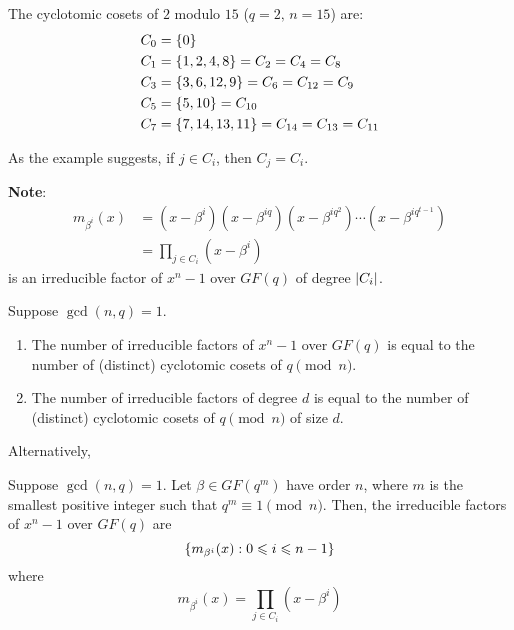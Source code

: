 \begin{Example}{}{}
    The cyclotomic cosets of $ 2 $ modulo $ 15 $ ($ q=2,\,n=15 $) are:
    \begin{align*}
        C_0 & =\{0\}                               \\
        C_1 & =\{1,2,4,8\}=C_2=C_4=C_8             \\
        C_3 & =\{3,6,12,9\}=C_6=C_{12}=C_9         \\
        C_5 & =\{5,10\}=C_{10}                     \\
        C_7 & =\{7,14,13,11\}=C_{14}=C_{13}=C_{11}
    \end{align*}
\end{Example}

As the example suggests, if $ j\in C_i $, then $ C_j=C_i $.

\textbf{Note}:
\begin{align*}
    m_{\beta^i}(x)
     & =(x-\beta^i)(x-\beta^{iq})(x-\beta^{iq^2})\cdots(x-\beta^{iq^{t-1}}) \\
     & =\prod_{j\in C_i}(x-\beta^i)
\end{align*}
is an irreducible factor of $ x^n-1 $ over $ GF(q) $ of degree $ \lvert C_i\rvert $.


\begin{Theorem}{}{}
    Suppose $ \gcd(n,q)=1 $.
    \begin{enumerate}[label=(\roman*)]
        \item The number of irreducible factors of $ x^n-1 $
              over $ GF(q) $ is equal to the number of (distinct)
              cyclotomic cosets of $ q\pmod{n} $.
        \item The number of irreducible factors of degree $ d $
              is equal to the number of (distinct)
              cyclotomic cosets of $ q\pmod{n} $ of size $ d $.
    \end{enumerate}
\end{Theorem}


Alternatively,

\begin{Theorem}{}{}
    Suppose $ \gcd(n,q)=1 $. Let $ \beta\in GF(q^m) $ have order
    $ n $, where $ m $ is the smallest positive integer such that
    $ q^m\equiv 1\pmod{n} $. Then, the irreducible factors of $ x^n-1 $
    over $ GF(q) $ are
    \[ \{m_{\beta^i}(x):0\leqslant i\leqslant n-1\} \]
    where
    \[ m_{\beta^i}(x)=\prod_{j\in C_i}(x-\beta^i) \]
\end{Theorem}



